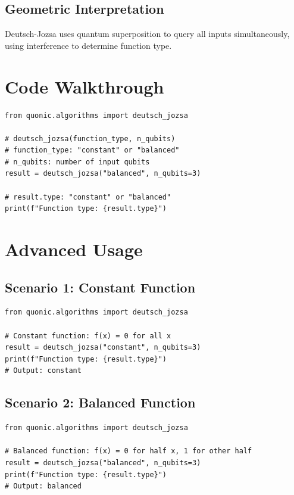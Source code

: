 \documentclass[12pt,a4paper]{article}
\begin{document}
\subsection{Geometric Interpretation}

Deutsch-Jozsa uses quantum superposition to query all inputs simultaneously, using interference to determine function type.

\section{Code Walkthrough}

\begin{verbatim}
from quonic.algorithms import deutsch_jozsa

# deutsch_jozsa(function_type, n_qubits)
# function_type: "constant" or "balanced"
# n_qubits: number of input qubits
result = deutsch_jozsa("balanced", n_qubits=3)

# result.type: "constant" or "balanced"
print(f"Function type: {result.type}")
\end{verbatim}

\section{Advanced Usage}

\subsection{Scenario 1: Constant Function}

\begin{verbatim}
from quonic.algorithms import deutsch_jozsa

# Constant function: f(x) = 0 for all x
result = deutsch_jozsa("constant", n_qubits=3)
print(f"Function type: {result.type}")
# Output: constant
\end{verbatim}

\subsection{Scenario 2: Balanced Function}

\begin{verbatim}
from quonic.algorithms import deutsch_jozsa

# Balanced function: f(x) = 0 for half x, 1 for other half
result = deutsch_jozsa("balanced", n_qubits=3)
print(f"Function type: {result.type}")
# Output: balanced
\end{verbatim}
\end{document}
